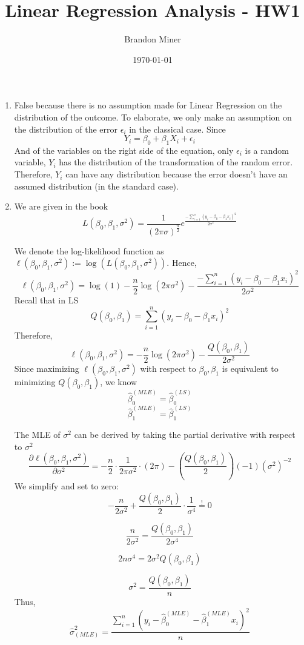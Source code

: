 \documentclass{article}
\title{Linear Regression Analysis - HW1}
\author{Brandon Miner}
\date{\today}
\begin{document}
\maketitle 

\begin{enumerate}
    \item 
    False because there is no assumption made for Linear Regression on the distribution of the outcome. To elaborate, we only make an assumption on the distribution of the error $\epsilon_i$ in the classical case. Since $$Y_i=\beta_0+\beta_1X_i+\epsilon_i$$
    And of the variables on the right side of the equation, only $\epsilon_i$ is a random variable, $Y_i$ has the distribution of the transformation of the random error. Therefore, $Y_i$ can have any distribution because the error doesn't have an assumed distribution (in the standard case).
    
    \item 
    We are given in the book
    $$L(\beta_0,\beta_1,\sigma^2)=\frac{1}{(2\pi\sigma)^{\frac{n}{2}}}e^{\frac{-\sum^n_{i=1}(y_i-\beta_0-\beta_1x_i)^2}{2\sigma^2}}$$

    We denote the log-likelihood function as $\ell(\beta_0,\beta_1,\sigma^2):=\log(L(\beta_0,\beta_1,\sigma^2))$.
    Hence,
    $$\ell(\beta_0,\beta_1,\sigma^2)=\log(1)-\frac{n}{2}\log(2\pi\sigma^2)-\frac{-\sum^n_{i=1}(y_i-\beta_0-\beta_1x_i)^2}{2\sigma^2}$$
    Recall that in LS $$Q(\beta_0,\beta_1)=\sum^n_{i=1}(y_i-\beta_0-\beta_1x_i)^2$$
    Therefore,
    $$\ell(\beta_0,\beta_1,\sigma^2)=-\frac{n}{2}\log(2\pi\sigma^2)-\frac{Q(\beta_0,\beta_1)}{2\sigma^2}$$
    Since maximizing $\ell(\beta_0,\beta_1,\sigma^2)$ with respect to $\beta_0,\beta_1$ is equivalent to minimizing $Q(\beta_0, \beta_1)$, we know
    $$\hat\beta_0^{(MLE)}=\hat\beta_0^{(LS)}$$
    $$\hat\beta_1^{(MLE)}=\hat\beta_1^{(LS)}$$
    
    The MLE of $\sigma^2$ can be derived by taking the partial derivative with respect to $\sigma^2$
    $$\frac{\partial\ell(\beta_0,\beta_1,\sigma^2)}{\partial\sigma^2}=-\frac{n}{2}\cdot\frac{1}{2\pi\sigma^2}\cdot(2\pi)-(\frac{Q(\beta_0,\beta_1)}{2})(-1)(\sigma^2)^{-2}$$
    We simplify and set to zero:
    $$-\frac{n}{2\sigma^2}+\frac{Q(\beta_0,\beta_1)}{2}\cdot\frac{1}{\sigma^4}\stackrel{!}{=}0$$

    $$\frac{n}{2\sigma^2}=\frac{Q(\beta_0,\beta_1)}{2\sigma^4}$$

    $$2n\sigma^4=2\sigma^2Q(\beta_0,\beta_1)$$
    $$$$
    
    $$\sigma^2=\frac{Q(\beta_0,\beta_1)}{n}$$
    Thus,
    $$\hat\sigma^2_{(MLE)}=\frac{\sum^n_{i=1}(y_i-\hat\beta_0^{(MLE)}-\hat\beta_1^{(MLE)}x_i)^2}{n}$$
    

\end{enumerate}
\end{document}
